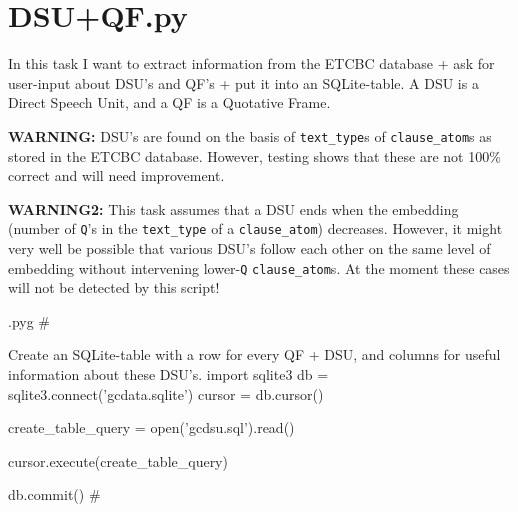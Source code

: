 \documentclass{report}
\makeatletter
\newcommand{\mi}[1]{\lstinline{#1}}
\newenvironment{python}{%
  \VerbatimEnvironment
  \minted@resetoptions
  \setkeys{minted@opt}{}
      \begin{VerbatimOut}{\jobname.pyg}}
{%
      \end{VerbatimOut}
      \minted@pygmentize{python}
      \DeleteFile{\jobname.pyg}}
\makeatother
\begin{document}
\chapter{DSU+QF.py}
\lstset{language=python,basicstyle=\ttfamily}

\begin{multicols}{2}
In this task I want to extract information from the ETCBC database + ask for user-input about DSU's and QF's + put it into an SQLite-table.
A DSU is a Direct Speech Unit, and a QF is a Quotative Frame.

\textbf{WARNING:} DSU's are found on the basis of \mi{text_type}s of \mi{clause_atom}s as stored in the ETCBC database. However, testing shows that these are not 100\% correct and will need improvement.

\textbf{WARNING2:} This task assumes that a DSU ends when the embedding (number of \mi{Q}'s in the \mi{text_type} of a \mi{clause_atom}) decreases.
However, it might very well be possible that various DSU's follow each other on the same level of embedding without intervening lower-\mi{Q} \mi{clause_atom}s.
At the moment these cases will not be detected by this script!
\end{multicols}

\begin{python}
#{{{ Create an SQLite-table with a row for every QF + DSU, and columns for useful information about these DSU's.
import sqlite3
db = sqlite3.connect('gcdata.sqlite')
cursor = db.cursor()

create_table_query = open('gcdsu.sql').read()

cursor.execute(create_table_query)

db.commit()
#}}}
\end{python}
\end{document}
